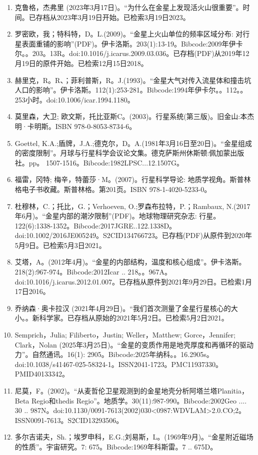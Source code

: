 \begin{enumerate}
\item 克鲁格，杰弗里 (2023年3月17日)。“为什么在金星上发现活火山很重要”。时间。已存档从2023年3月19日开始。已检索3月19日2023。
\item 罗密欧，我；特科特，D。L.(2009)。“金星上火山单位的频率区域分布: 对行星表面重铺的影响”(PDF)。伊卡洛斯。203(1):13-19。Bibcode:2009年伊卡尔。。203。13R。doi:10.1016/j.icarus.2009.03.036。已存档(PDF)从2019年12月19日的原件开始。已检索12月15日2018。
\item 赫里克，R。R、；菲利普斯，R。J.(1993)。“金星大气对传入流星体和撞击坑人口的影响”。伊卡洛斯。112(1):253-281。Bibcode:1994年伊卡尔。。112。。253小时。doi:10.1006/icar.1994.1180。
\item 莫里森，大卫; 欧文斯，托比亚斯C。(2003)。行星系统(第三版)。旧金山:本杰明·卡明斯。ISBN 978-0-8053-8734-6。
\item Goettel, K.A.;盾牌，J.A.;德克尔，D。A.(1981年3月16日至20日)。“金星组成的密度限制”。月球与行星科学会议论文集。德克萨斯州休斯顿:佩加蒙出版社。pp。 1507-1516。Bibcode:1982LPSC...12.1507G。
\item 福雷，冈特; 梅辛，特蕾莎·M。(2007)。行星科学导论: 地质学视角。斯普林格电子书收藏。斯普林格。第201页。ISBN 978-1-4020-5233-0。
\item 杜穆林，C.；托比，G.；Verhoeven, O.;罗森布拉特，P.；Rambaux, N.(2017年6月)。“金星内部的潮汐限制”(PDF)。地球物理研究杂志: 行星。122(6):1338-1352。Bibcode:2017JGRE..122.1338D。doi:10.1002/2016JE005249。S2CID134766723。已存档(PDF)从原件到2020年5月9日。已检索5月3日2021。  
\item 艾塔，A。(2012年4月)。“金星的内部结构，温度和核心组成”。伊卡洛斯。218(2):967-974。Bibcode:2012Icar .. 218。。967A。doi:10.1016/j.icarus.2012.01.007。已存档从原件到2021年9月29日。已检索1月17日2016。
\item 乔纳森·奥卡拉汉 (2021年4月29日)。“我们首次测量了金星行星核心的大小。。新科学家。已存档从原始的2021年5月2日。已检索5月2日2021。
\item Semprich，Julia; Filiberto，Justin; Weller，Matthew; Gorce，Jennifer; Clark，Nolan (2025年3月25日)。“金星的变质作用是地壳厚度和再循环的驱动力”。自然通讯。16(1): 2905。Bibcode:2025年纳科。。16.2905s。doi:10.1038/s41467-025-58324-1。ISSN2041-1723。PMC11937330。PMID40133342。   
\item 尼莫，F。(2002)。“从麦哲伦卫星观测到的金星地壳分析阿塔兰塔Planitia，Beta Regio和thedis Regio”。地质学。30(11):987-990。Bibcode:2002Geo .... 30 .. 987N。doi:10.1130/0091-7613(2002)030<0987:WDVLAM>2.0.CO;2。ISSN0091-7613。S2CID13293506。  
\item 多尔吉诺夫，Sh.；埃罗申科，E.G.;刘易斯，L。(1969年9月)。“金星附近磁场的性质”。宇宙研究。7: 675。Bibcode:1969年科斯雷。7 .. 675D。

\end{enumerate}
